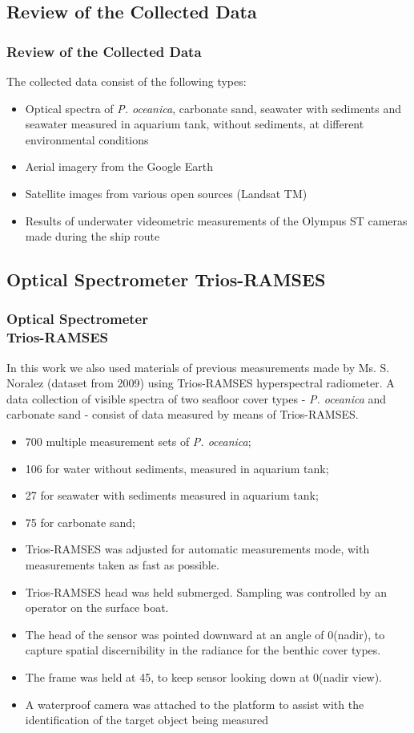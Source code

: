 \documentclass[pdflatex,compress,9pt,
	xcolor={dvipsnames,dvipsnames,svgnames,x11names,table},
	hyperref={colorlinks = true,breaklinks = true, urlcolor = NavyBlue, breaklinks = true}]{beamer}
\begin{document}
\subsection{Review of the Collected Data}
\begin{frame}\frametitle{Review of the Collected Data}
The collected data consist of the following types:
\begin{itemize}
	\item Optical spectra of \emph{P. oceanica}, carbonate sand, seawater with sediments and seawater measured in aquarium tank, without sediments, at different environmental conditions
	\item Aerial imagery from the Google Earth
	\item Satellite images from various open sources (\ac{Landsat TM})
	\item Results of underwater videometric measurements of the Olympus ST cameras made during the ship route
\end{itemize}
\end{frame}

\subsection{Optical Spectrometer Trios-RAMSES}
\begin{frame}\frametitle{Optical Spectrometer \\Trios-RAMSES}
In this work we also used materials of previous measurements made by Ms. S. Noralez (dataset from 2009) using \ac{Trios-RAMSES} hyperspectral radiometer. A data collection of visible spectra of two seafloor cover types - \emph{P. oceanica} and carbonate sand - consist of data measured by means of \ac{Trios-RAMSES}.
\begin{itemize}
	\item 700 multiple measurement sets of \emph{P. oceanica};
	\item 106 for water without sediments, measured in aquarium tank;
	\item 27 for seawater with sediments measured in aquarium tank;
	\item 75 for carbonate sand;
\end{itemize}
\begin{itemize}
	\item \ac{Trios-RAMSES} was adjusted for automatic measurements mode, with measurements taken as fast as possible.
	\item \ac{Trios-RAMSES} head was held submerged. Sampling was controlled by an operator on the surface boat.
	\item The head of the sensor was pointed downward at an angle of 0\degree (nadir), to capture spatial discernibility in the radiance for the benthic cover types.
	\item The frame was held at 45\degree, to keep sensor looking down at 0\degree (nadir view).
	\item A waterproof camera was attached to the platform to assist with the identification of the target object being measured
\end{itemize}
\end{frame}
\end{document}
